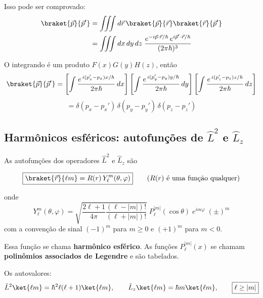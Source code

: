 Isso pode ser comprovado:
\begin{align}
    \braket{\vec{p}}{\vec{p}'} &= \iiint d\vec{r} \, \braket{\vec{p}}{\vec{r}} \braket{\vec{r}}{\vec{p}'} \notag \\
    &= \iiint dx\,dy\,dz \; \frac{e^{-i\vec{p}\cdot\vec{r}/\hbar}\, e^{i\vec{p}'\cdot\vec{r}/\hbar}}{(2\pi\hbar)^3}
\label{eq:aula20_pp_integral}
\end{align}

O integrando é um produto $F(x)G(y)H(z)$, então
\begin{equation}
    \braket{\vec{p}}{\vec{p}'} = \left[ \int \frac{e^{\,i(p_x'-p_x)x/\hbar}}{2\pi\hbar}\,dx \right] \left[ \int \frac{e^{\,i(p_y'-p_y)y/\hbar}}{2\pi\hbar}\,dy \right] \left[ \int \frac{e^{\,i(p_z'-p_z)z/\hbar}}{2\pi\hbar}\,dz \right]
\label{eq:aula20_pp_fatorado}
\end{equation}
\begin{equation}
    = \delta(p_x - p_x')\,\delta(p_y - p_y')\,\delta(p_z - p_z')
\label{eq:aula20_pp_resultado}
\end{equation}

\subsection*{Harmônicos esféricos: autofunções de $\hat{L}^2$ e $\hat{L}_z$}

As autofunções dos operadores $\hat{L}^2$ e $\hat{L}_z$ são

\begin{equation}
    \boxed{\braket{\vec{r}}{\ell m} = R(r)\, Y_\ell^m(\theta, \varphi)} \qquad \text{($R(r)$ é uma função qualquer)}
\label{eq:aula20_def_lm}
\end{equation}

onde
\begin{equation}
    Y_\ell^m(\theta,\varphi) = \sqrt{\frac{2\ell+1}{4\pi} \frac{(\ell-|m|)!}{(\ell+|m|)!}} \; P_\ell^{|m|}(\cos\theta) \; e^{im\varphi} \;(\pm)^m
\label{eq:aula20_harmonico_esferico_def}
\end{equation}
com a convenção de sinal $(-1)^m$ para $m \geq 0$ e $(+1)^m$ para $m < 0$.

Essa função se chama \textbf{harmônico esférico}. As funções $P_\ell^{|m|}(x)$ se chamam \textbf{polinômios associados de Legendre} e são tabelados.

Os autovalores:
\begin{equation}
    \hat{L}^2 \ket{\ell m} = \hbar^2 \ell(\ell+1) \ket{\ell m}, \qquad \hat{L}_z \ket{\ell m} = \hbar m \ket{\ell m}, \qquad \boxed{\ell \geq |m|}
\label{eq:aula20_autovalores_L2Lz}
\end{equation}

